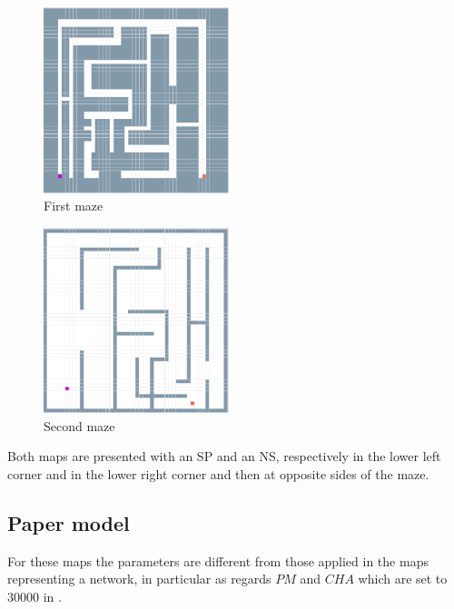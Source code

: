 \begin{figure}
  \centering
    \includegraphics[width=0.48\textwidth]{maze_gpgpu_exp/1_maze_gpgpu}%
    
  \caption{First maze}
  \label{fig:maze_gpgpu_exp/1_maze_gpgpu}
\end{figure}

\begin{figure}
  \centering
    \includegraphics[width=0.48\textwidth]{generic_maze_exp/1_generic_maze}%
    
  \caption{Second maze}
  \label{fig:generic_maze_exp/1_generic_maze}
\end{figure}

Both maps are presented with an SP and an NS, respectively in the lower left corner and in the lower right corner and then at opposite sides of the maze.

\subsection{Paper model}
\label{paper_model}

For these maps the parameters are different from those applied in the maps representing a network, in particular as regards $PM$ and $CHA$ which are set to 30000 in \cite{dourvas2016gpgpu}.

